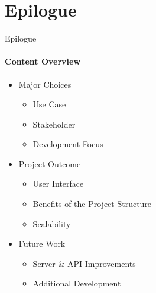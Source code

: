 \author{Marc}
\section{Epilogue}
    \begin{frame}{Epilogue}\framesubtitle{Content Overview}
        \begin{itemize}
            \item<1-> Major Choices
            \begin{itemize}
                    \item Use Case
                    \item Stakeholder 
                    \item Development Focus
            \end{itemize}
            \item<2-> Project Outcome
                \begin{itemize}
                    \item User Interface
                    \item Benefits of the Project Structure 
                    \item Scalability
                \end{itemize}
            \item<3-> Future Work
            \begin{itemize}
                \item Server \& API Improvements
                \item Additional Development
            \end{itemize}
        \end{itemize}
    \end{frame}

